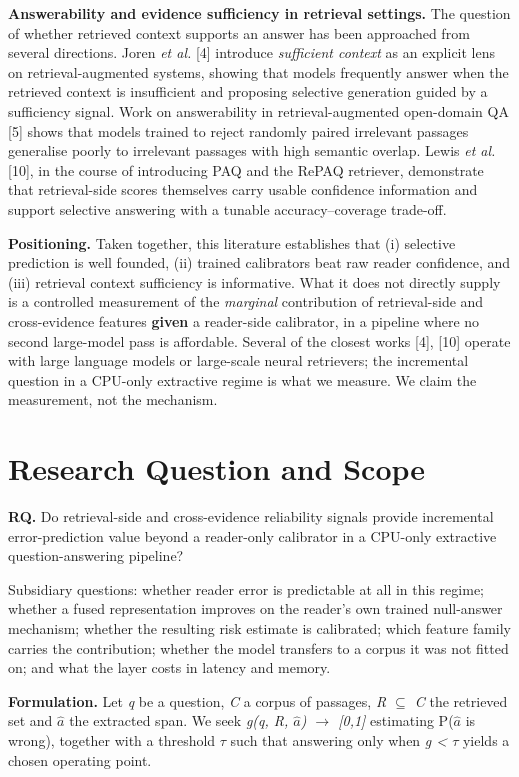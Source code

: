 \documentclass[conference]{IEEEtran}
\begin{document}
\textbf{Answerability and evidence sufficiency in retrieval settings.} The question of whether retrieved context supports an answer has been approached from several directions. Joren \emph{et al.} [4] introduce \emph{sufficient context} as an explicit lens on retrieval-augmented systems, showing that models frequently answer when the retrieved context is insufficient and proposing selective generation guided by a sufficiency signal. Work on answerability in retrieval-augmented open-domain QA [5] shows that models trained to reject randomly paired irrelevant passages generalise poorly to irrelevant passages with high semantic overlap. Lewis \emph{et al.} [10], in the course of introducing PAQ and the RePAQ retriever, demonstrate that retrieval-side scores themselves carry usable confidence information and support selective answering with a tunable accuracy--coverage trade-off.

\textbf{Positioning.} Taken together, this literature establishes that (i) selective prediction is well founded, (ii) trained calibrators beat raw reader confidence, and (iii) retrieval context sufficiency is informative. What it does not directly supply is a controlled measurement of the \emph{marginal} contribution of retrieval-side and cross-evidence features \textbf{given} a reader-side calibrator, in a pipeline where no second large-model pass is affordable. Several of the closest works [4], [10] operate with large language models or large-scale neural retrievers; the incremental question in a CPU-only extractive regime is what we measure. We claim the measurement, not the mechanism.

\section{Research Question and Scope}

\textbf{RQ.} Do retrieval-side and cross-evidence reliability signals provide incremental error-prediction value beyond a reader-only calibrator in a CPU-only extractive question-answering pipeline?

Subsidiary questions: whether reader error is predictable at all in this regime; whether a fused representation improves on the reader's own trained null-answer mechanism; whether the resulting risk estimate is calibrated; which feature family carries the contribution; whether the model transfers to a corpus it was not fitted on; and what the layer costs in latency and memory.

\textbf{Formulation.} Let \emph{q} be a question, \emph{C} a corpus of passages, \emph{R $\subseteq$ C} the retrieved set and \emph{$\hat{a}$} the extracted span. We seek \emph{g(q, R, $\hat{a}$) $\rightarrow$ [0,1]} estimating P(\emph{$\hat{a}$} is wrong), together with a threshold \emph{$\tau$} such that answering only when \emph{g < $\tau$} yields a chosen operating point.
\end{document}
